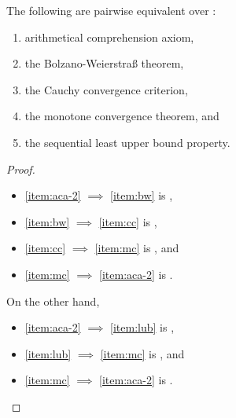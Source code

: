 \documentclass[../main.tex]{memoir}
\begin{document}
\begin{theorem}
  \label{thm:aca-equivalences}

  The following are pairwise equivalent over \rca:

  \begin{enumerate}[label=(\roman*), ref=(\roman*)]
  \item \label{item:aca-2} arithmetical comprehension axiom,
  \item \label{item:bw} the Bolzano-Weierstra{\ss} theorem,
  \item \label{item:cc} the Cauchy convergence criterion,
  \item \label{item:mc} the monotone convergence theorem, and
  \item \label{item:lub} the sequential least upper bound property.
  \end{enumerate}
\end{theorem}
\begin{proof}
  \begin{itemize}
  \item \ref{item:aca-2} $\implies$ \ref{item:bw} is ,
  \item \ref{item:bw} $\implies$ \ref{item:cc} is ,
  \item \ref{item:cc} $\implies$ \ref{item:mc} is , and
  \item \ref{item:mc} $\implies$ \ref{item:aca-2} is .
  \end{itemize}

  On the other hand,

  \begin{itemize}
  \item \ref{item:aca-2} $\implies$ \ref{item:lub} is ,
  \item \ref{item:lub} $\implies$ \ref{item:mc} is , and
  \item \ref{item:mc} $\implies$ \ref{item:aca-2} is .
  \end{itemize}
\end{proof}
\end{document}
